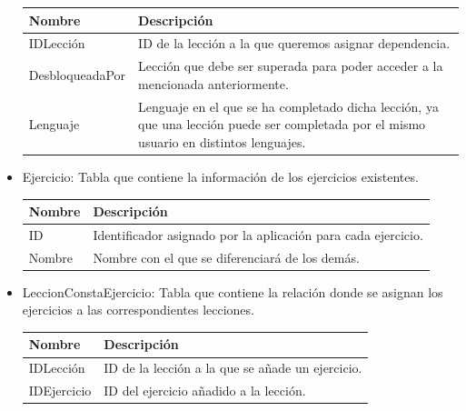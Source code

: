 \begin{itemize}
\begin{tabularx}{14cm}{|l|X|}
\hline
\textbf{Nombre} & \textbf{Descripción}                                                              \\ \hline
IDLección       & ID de la lección a la que queremos asignar dependencia.                                                          \\ \hline
DesbloqueadaPor     & Lección que debe ser superada para poder acceder a la mencionada anteriormente.                                           \\ \hline
Lenguaje            & Lenguaje en el que se ha completado dicha lección, ya que una lección puede ser completada por el mismo usuario en distintos lenguajes. \\ \hline
\end{tabularx}
\vspace{1em}

\item Ejercicio: Tabla que contiene la información de los ejercicios existentes.

\begin{tabularx}{14cm}{|l|X|}
\hline
\textbf{Nombre} & \textbf{Descripción}                                                              \\ \hline
ID       & Identificador asignado por la aplicación para cada ejercicio. \\ \hline
Nombre     & Nombre con el que se diferenciará de los demás.                                           \\ \hline
\end{tabularx}
\vspace{1em}

\item LeccionConstaEjercicio: Tabla que contiene la relación donde se asignan los ejercicios a las correspondientes lecciones.

\begin{tabularx}{14cm}{|l|X|}
\hline
\textbf{Nombre} & \textbf{Descripción}                                                              \\ \hline
IDLección       & ID de la lección a la que se añade un ejercicio. \\ \hline
IDEjercicio     & ID del ejercicio añadido a la lección.                                           \\ \hline
\end{tabularx}
\vspace{1em}


\end{itemize}
